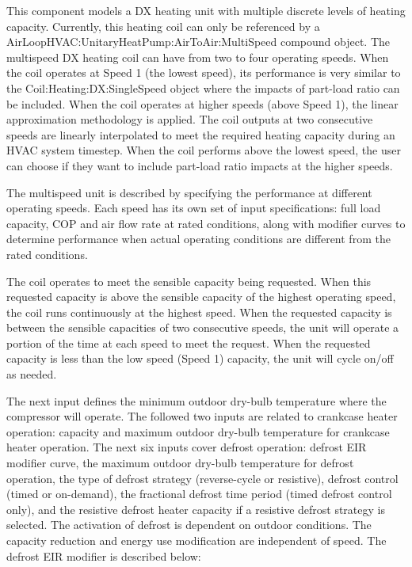 This component models a DX heating unit with multiple discrete levels of heating capacity. Currently, this heating coil can only be referenced by a AirLoopHVAC:UnitaryHeatPump:AirToAir:MultiSpeed compound object. The multispeed DX heating coil can have from two to four operating speeds. When the coil operates at Speed 1 (the lowest speed), its performance is very similar to the Coil:Heating:DX:SingleSpeed object where the impacts of part-load ratio can be included. When the coil operates at higher speeds (above Speed 1), the linear approximation methodology is applied. The coil outputs at two consecutive speeds are linearly interpolated to meet the required heating capacity during an HVAC system timestep. When the coil performs above the lowest speed, the user can choose if they want to include part-load ratio impacts at the higher speeds.

The multispeed unit is described by specifying the performance at different operating speeds. Each speed has its own set of input specifications: full load capacity, COP and air flow rate at rated conditions, along with modifier curves to determine performance when actual operating conditions are different from the rated conditions.

The coil operates to meet the sensible capacity being requested. When this requested capacity is above the sensible capacity of the highest operating speed, the coil runs continuously at the highest speed. When the requested capacity is between the sensible capacities of two consecutive speeds, the unit will operate a portion of the time at each speed to meet the request. When the requested capacity is less than the low speed (Speed 1) capacity, the unit will cycle on/off as needed.

The next input defines the minimum outdoor dry-bulb temperature where the compressor will operate. The followed two inputs are related to crankcase heater operation: capacity and maximum outdoor dry-bulb temperature for crankcase heater operation. The next six inputs cover defrost operation: defrost EIR modifier curve, the maximum outdoor dry-bulb temperature for defrost operation, the type of defrost strategy (reverse-cycle or resistive), defrost control (timed or on-demand), the fractional defrost time period (timed defrost control only), and the resistive defrost heater capacity if a resistive defrost strategy is selected. The activation of defrost is dependent on outdoor conditions. The capacity reduction and energy use modification are independent of speed. The defrost EIR modifier is described below:

